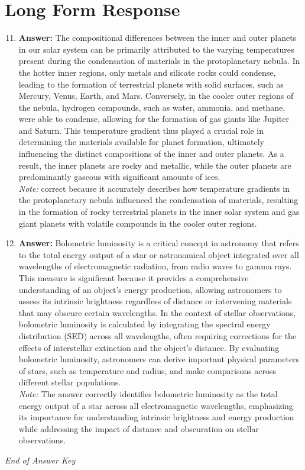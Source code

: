 \documentclass[12pt]{article}
\begin{document}
\section*{Long Form Response}
\begin{enumerate}[label=\arabic*.]
\setcounter{enumi}{10}
\item \textbf{Answer:} The compositional differences between the inner and outer planets in our solar system can be primarily attributed to the varying temperatures present during the condensation of materials in the protoplanetary nebula. In the hotter inner regions, only metals and silicate rocks could condense, leading to the formation of terrestrial planets with solid surfaces, such as Mercury, Venus, Earth, and Mars. Conversely, in the cooler outer regions of the nebula, hydrogen compounds, such as water, ammonia, and methane, were able to condense, allowing for the formation of gas giants like Jupiter and Saturn. This temperature gradient thus played a crucial role in determining the materials available for planet formation, ultimately influencing the distinct compositions of the inner and outer planets. As a result, the inner planets are rocky and metallic, while the outer planets are predominantly gaseous with significant amounts of ices.
\\ \textit{Note:} correct because it accurately describes how temperature gradients in the protoplanetary nebula influenced the condensation of materials, resulting in the formation of rocky terrestrial planets in the inner solar system and gas giant planets with volatile compounds in the cooler outer regions.
\item \textbf{Answer:} Bolometric luminosity is a critical concept in astronomy that refers to the total energy output of a star or astronomical object integrated over all wavelengths of electromagnetic radiation, from radio waves to gamma rays. This measure is significant because it provides a comprehensive understanding of an object's energy production, allowing astronomers to assess its intrinsic brightness regardless of distance or intervening materials that may obscure certain wavelengths. In the context of stellar observations, bolometric luminosity is calculated by integrating the spectral energy distribution (SED) across all wavelengths, often requiring corrections for the effects of interstellar extinction and the object's distance. By evaluating bolometric luminosity, astronomers can derive important physical parameters of stars, such as temperature and radius, and make comparisons across different stellar populations.
\\ \textit{Note:} The answer correctly identifies bolometric luminosity as the total energy output of a star across all electromagnetic wavelengths, emphasizing its importance for understanding intrinsic brightness and energy production while addressing the impact of distance and obscuration on stellar observations.
\end{enumerate}

\vfill
\noindent\textit{End of Answer Key}
\end{document}
